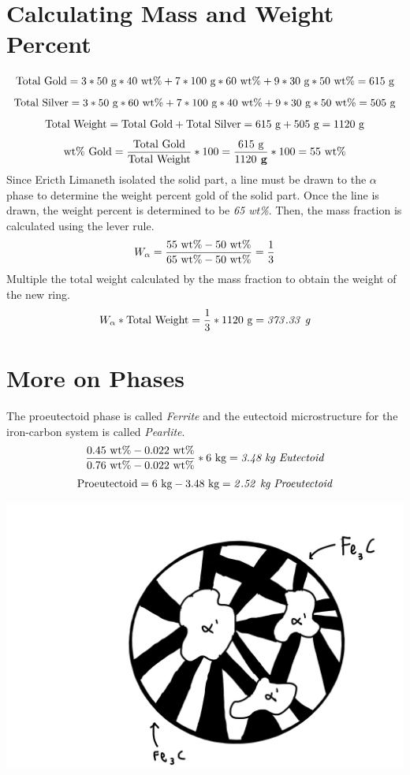 \documentclass{article}
\begin{document}
\section*{Calculating Mass and Weight Percent}
\[\textnormal{Total Gold}=3*50\textnormal{ g}*40\textnormal{ wt\%}+7*100\textnormal{ g}*60\textnormal{ wt\%}+9*30\textnormal{ g}*50\textnormal{ wt\%}=615 \textnormal{ g}\]
\[\textnormal{Total Silver}=3*50\textnormal{ g}*60\textnormal{ wt\%}+7*100\textnormal{ g}*40\textnormal{ wt\%}+9*30\textnormal{ g}*50\textnormal{ wt\%}=505 \textnormal{ g}\]
\[\textnormal{Total Weight}=\textnormal{Total Gold}+\textnormal{Total Silver}=615 \textnormal{ g}+505 \textnormal{ g}=1120 \textnormal{ g}\]
\[\textnormal{wt\% Gold}=\frac{\textnormal{Total Gold}}{\textnormal{Total Weight}}*100=\frac{615 \textnormal{ g}}{1120 \textbf{ g}}*100=55\textnormal{ wt\%}\]
Since Ericth Limaneth isolated the solid part, a line must be drawn to the \(\alpha\) phase to determine the weight percent gold of the solid part. Once the line is drawn, the weight percent is determined to be \textit{65 wt\%}. Then, the mass fraction is calculated using the lever rule.
\[W_\alpha=\frac{55 \textnormal{ wt\%}-50 \textnormal{ wt\%}}{65 \textnormal{ wt\%}-50 \textnormal{ wt\%}}=\frac{1}{3}\]
Multiple the total weight calculated by the mass fraction to obtain the weight of the new ring.
\[W_\alpha*\textnormal{Total Weight}=\frac{1}{3}*1120\textnormal{ g}=\mathit{373.33} \textit{ g}\]
\section*{More on Phases}
The proeutectoid phase is called \textit{Ferrite} and the eutectoid microstructure for the iron-carbon system is called \textit{Pearlite}.\\
\[\frac{0.45 \textnormal{ wt\%}-0.022 \textnormal{ wt\%}}{0.76 \textnormal{ wt\%}-0.022 \textnormal{ wt\%}}*6\textnormal{ kg}=\textit{3.48 kg Eutectoid}\]
\[\textnormal{Proeutectoid}=6\textnormal{ kg}-3.48\textnormal{ kg}=\mathit{2.52}\textit{ kg Proeutectoid}\]
\begin{center}
\includegraphics[scale=0.12]{Question 13.png}
\end{center}
\end{document}
